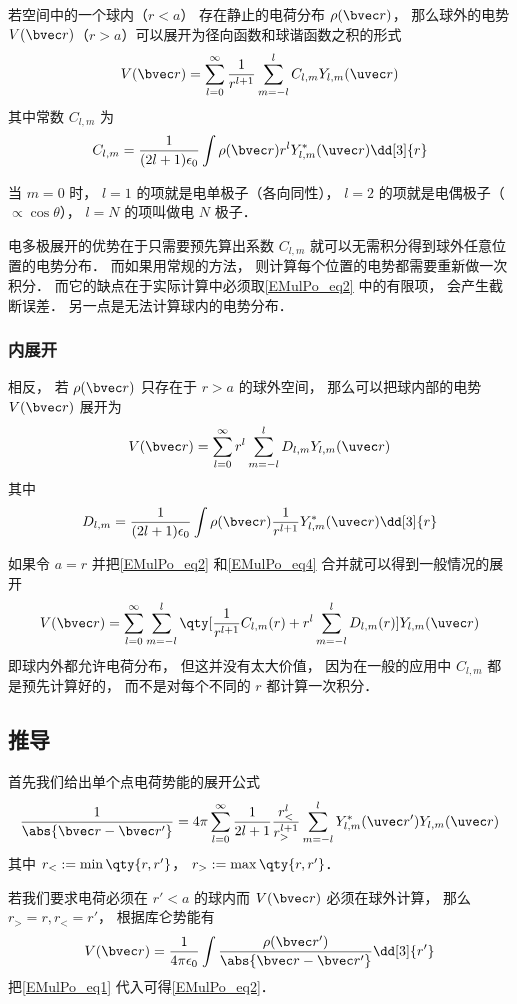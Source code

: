 

若空间中的一个球内（$r < a$） 存在静止的电荷分布 $\rho(\bvec r)$， 那么球外的电势 $V(\bvec r)$（$r > a$）可以展开为径向函数和球谐函数之积的形式
\begin{equation}\label{EMulPo_eq2}
V(\bvec r) = \sum_{l = 0}^\infty \frac{1}{r^{l+1}}\sum_{m = -l}^l C_{l,m} Y_{l,m}(\uvec r)
\end{equation}
其中常数 $C_{l,m}$ 为
\begin{equation}
C_{l,m} = \frac{1}{(2l+1)\epsilon_0} \int \rho(\bvec r) r^l Y_{l,m}^*(\uvec r) \dd[3]{r}
\end{equation}

当 $m = 0$ 时， $l = 1$ 的项就是电单极子（各向同性）， $l = 2$ 的项就是电偶极子（$\propto\cos \theta$）， $l = N$ 的项叫做电 $N$ 极子．

电多极展开的优势在于只需要预先算出系数 $C_{l,m}$ 就可以无需积分得到球外任意位置的电势分布． 而如果用常规的方法， 则计算每个位置的电势都需要重新做一次积分． 而它的缺点在于实际计算中必须取\autoref{EMulPo_eq2} 中的有限项， 会产生截断误差． 另一点是无法计算球内的电势分布．

\subsubsection{内展开}
相反， 若 $\rho(\bvec r)$ 只存在于 $r > a$ 的球外空间， 那么可以把球内部的电势 $V(\bvec r)$ 展开为
\begin{equation}\label{EMulPo_eq4}
V(\bvec r) = \sum_{l = 0}^\infty r^l \sum_{m = -l}^l D_{l,m} Y_{l,m}(\uvec r)
\end{equation}
其中
\begin{equation}\label{EMulPo_eq3}
D_{l,m} = \frac{1}{(2l+1)\epsilon_0} \int \rho(\bvec r) \frac{1}{r^{l+1}} Y_{l,m}^*(\uvec r) \dd[3]{r}
\end{equation}

如果令 $a = r$ 并把\autoref{EMulPo_eq2} 和\autoref{EMulPo_eq4} 合并就可以得到一般情况的展开
\begin{equation}
V(\bvec r) = \sum_{l = 0}^\infty\sum_{m = -l}^l \qty[\frac{1}{r^{l+1}} C_{l,m}(r) + r^l \sum_{m = -l}^l D_{l,m}(r)] Y_{l,m}(\uvec r)
\end{equation}
即球内外都允许电荷分布， 但这并没有太大价值， 因为在一般的应用中 $C_{l,m}$ 都是预先计算好的， 而不是对每个不同的 $r$ 都计算一次积分．

\subsection{推导}
首先我们给出单个点电荷势能的展开公式
\begin{equation}\label{EMulPo_eq1}
\frac{1}{\abs{\bvec r - \bvec r'}} = 4\pi \sum_{l=0}^{\infty} \frac{1}{2l+1} \frac{r_<^l}{r_>^{l+1}} \sum_{m = -l}^l Y_{l,m}^*(\uvec r') Y_{l,m}(\uvec r)
\end{equation}
其中 $r_< := \min\qty{r, r'}$， $r_> := \max\qty{r, r'}$．

若我们要求电荷必须在 $r' < a$ 的球内而 $V(\bvec r)$ 必须在球外计算， 那么 $r_> = r, r_< = r'$， 根据库仑势能有
\begin{equation}
V(\bvec r) = \frac{1}{4\pi\epsilon_0}\int \frac{\rho(\bvec r')}{\abs{\bvec r - \bvec r'}} \dd[3]{r'}
\end{equation}
把\autoref{EMulPo_eq1} 代入可得\autoref{EMulPo_eq2}．
